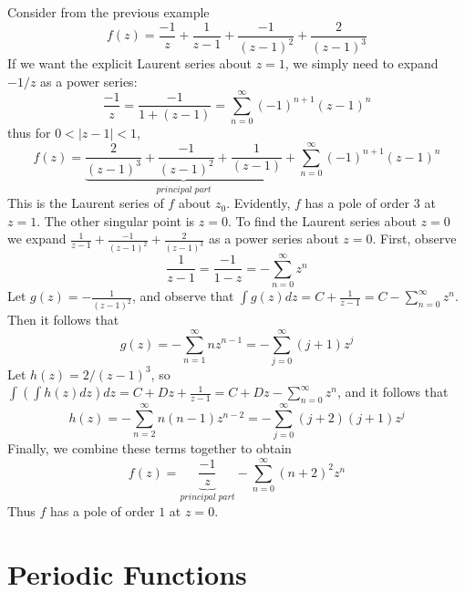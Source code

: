 \documentclass[12pt, a4paper, oneside, openright, titlepage]{book}
\begin{document}
\begin{eg}
    Consider from the previous example \begin{equation*}
        f(z) = \frac{-1}{z}+\frac{1}{z-1}+\frac{-1}{(z-1)^2}+\frac{2}{(z-1)^3}
    \end{equation*}
    If we want the explicit Laurent series about $z=1$, we simply need to expand $-1/z$ as a power series: \begin{equation*}
        \frac{-1}{z} = \frac{-1}{1+(z-1)} = \sum_{n=0}^{\infty}(-1)^{n+1}(z-1)^n
    \end{equation*}
    thus for $0 < |z-1| < 1$, \begin{equation*}
        f(z) = \underbrace{\frac{2}{(z-1)^3}+\frac{-1}{(z-1)^2}+\frac{1}{(z-1)}}_{principal\;part} + \sum_{n=0}^{\infty}(-1)^{n+1}(z-1)^n
    \end{equation*}
    This is the Laurent series of $f$ about $z_0$. Evidently, $f$ has a pole of order $3$ at $z = 1$. The other singular point is $z = 0$. To find the Laurent series about $z = 0$ we expand $\frac{1}{z-1}+\frac{-1}{(z-1)^2}+\frac{2}{(z-1)^3}$ as a power series about $z = 0$. First, observe \begin{equation*}
        \frac{1}{z-1} = \frac{-1}{1-z} = -\sum_{n=0}^{\infty}z^n
    \end{equation*}
    Let $g(z) = -\frac{1}{(z-1)^2}$, and observe that $\int g(z)dz = C + \frac{1}{z-1} = C - \sum_{n=0}^{\infty}z^n$. Then it follows that \begin{equation*}
        g(z) = -\sum_{n=1}^{\infty}nz^{n-1} = -\sum_{j=0}^{\infty}(j+1)z^j
    \end{equation*}
    Let $h(z) = 2/(z-1)^3$, so $\int(\int h(z)dz)dz = C+Dz+\frac{1}{z-1} = C+Dz - \sum_{n=0}^{\infty}z^n$, and it follows that \begin{equation*}
        h(z) = -\sum_{n=2}^{\infty}n(n-1)z^{n-2} = -\sum_{j=0}^{\infty}(j+2)(j+1)z^j
    \end{equation*}
    Finally, we combine these terms together to obtain \begin{equation*}
        f(z) = \underbrace{\frac{-1}{z}}_{principal\;part} -\sum_{n=0}^{\infty}(n+2)^2z^n
    \end{equation*}
    Thus $f$ has a pole of order $1$ at $z = 0$.
\end{eg}



\section{Periodic Functions}
\end{document}
